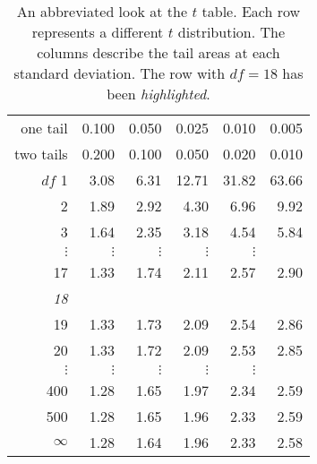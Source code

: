 \begin{table}[hht]
\centering
\begin{tabular}{r | rrr rr}
one tail & \hspace{1.5mm}  0.100 & \hspace{1.5mm} 0.050 & \hspace{1.5mm} 0.025 & \hspace{1.5mm} 0.010 & \hspace{1.5mm} 0.005  \\
two tails & 0.200 & 0.100 & 0.050 & 0.020 & 0.010 \\
\hline
{$df$} \hfill 1  &  {\normalsize  3.08} & {\normalsize  6.31} & {\normalsize 12.71} & {\normalsize 31.82} & {\normalsize 63.66}  \\ 
2  &  {\normalsize  1.89} & {\normalsize  2.92} & {\normalsize  4.30} & {\normalsize  6.96} & {\normalsize  9.92}  \\ 
3  &  {\normalsize  1.64} & {\normalsize  2.35} & {\normalsize  3.18} & {\normalsize  4.54} & {\normalsize  5.84}  \\ 
$\vdots$ & $\vdots$ &$\vdots$ &$\vdots$ &$\vdots$ & \\
17  &  {\normalsize  1.33} & {\normalsize  1.74} & {\normalsize  2.11} & {\normalsize  2.57} & {\normalsize  2.90}  \\ 
\em\color{tableHLBlue}18  &  \em\color{tableHLBlue}{\normalsize  1.33} & \em\color{tableHLBlue}{\normalsize  1.73} & \em\color{tableHLBlue}{\normalsize  2.10} & \em\color{tableHLBlue}{\normalsize  2.55} & \em\color{tableHLBlue}{\normalsize  2.88}  \\ 
19  &  {\normalsize  1.33} & {\normalsize  1.73} & {\normalsize  2.09} & {\normalsize  2.54} & {\normalsize  2.86}  \\ 
20  &  {\normalsize  1.33} & {\normalsize  1.72} & {\normalsize  2.09} & {\normalsize  2.53} & {\normalsize  2.85}  \\ 
$\vdots$ & $\vdots$ &$\vdots$ &$\vdots$ &$\vdots$ & \\
400  &  {\normalsize  1.28} & {\normalsize  1.65} & {\normalsize  1.97} & {\normalsize  2.34} & {\normalsize  2.59}  \\ 
500  &  {\normalsize  1.28} & {\normalsize  1.65} & {\normalsize  1.96} & {\normalsize  2.33} & {\normalsize  2.59}  \\ 
$\infty$  &  {\normalsize  1.28} & {\normalsize  1.64} & {\normalsize  1.96} & {\normalsize  2.33} & {\normalsize  2.58}  \\ 
\end{tabular}
\caption{An abbreviated look at the $t$ table. Each row represents a different $t$ distribution. The columns describe the tail areas at each standard deviation. The row with $df=18$ has been {\em\color{tableHLBlue}highlighted}.}
\label{tTableSample}
\end{table}

